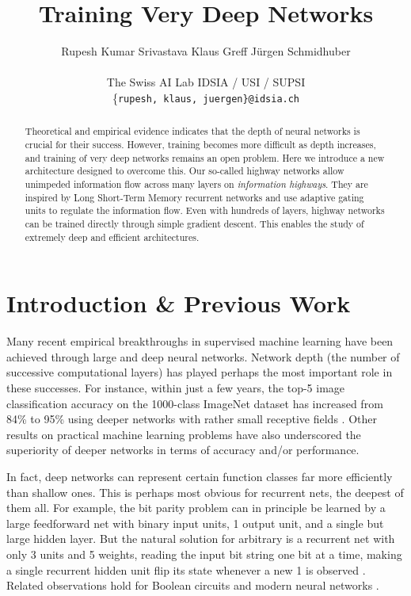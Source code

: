 \documentclass{article}
\title{Training Very Deep Networks}
\author{
Rupesh Kumar Srivastava \quad
Klaus Greff \quad
J{\"u}rgen Schmidhuber\\
\\
The Swiss AI Lab IDSIA /  USI / SUPSI\\
{\{\tt rupesh,\! klaus,\! juergen\}@idsia.ch}\\
}
\begin{document}
\maketitle

\begin{abstract}
Theoretical and empirical evidence indicates that the depth of neural networks is crucial for their success. However, training becomes more difficult as depth increases, and training of very deep networks remains an open problem. Here we introduce a new architecture designed to overcome this. 
Our so-called highway networks allow unimpeded information flow across many layers on \emph{information highways}. 
They are inspired by Long Short-Term Memory recurrent networks and use adaptive gating units to regulate the information flow.
Even with hundreds of layers, highway networks can be trained 
directly through simple gradient descent. This enables the study of extremely deep and efficient architectures.

\end{abstract}

\section{Introduction \& Previous Work}\label{sec:intro}

Many recent empirical breakthroughs in supervised machine learning have been achieved through  large and deep neural networks. Network depth (the number of successive computational layers) has played perhaps the most important role in these successes. For instance, within just a few years, the top-5 image classification accuracy on the 1000-class ImageNet dataset has increased from 84\% \cite{Krizhevsky2012} to 95\% \cite{Szegedy2014,Simonyan2014} using deeper networks with rather small receptive fields \cite{Ciresan2011,Ciresan2012}.
Other results on practical machine learning problems have also underscored the superiority of deeper networks \cite{Yu2013} in terms of accuracy and/or performance.

In fact, deep networks can represent certain function classes far more efficiently than shallow ones. This is perhaps most obvious for recurrent nets, the deepest of them all. For example, the  bit parity problem can in principle be learned by a large feedforward net with  binary input units, 1 output unit,  and a single but large hidden layer. But the natural solution for arbitrary  is a recurrent net with only 3 units and 5 weights, reading the input bit string one bit at a time,  making a single recurrent hidden unit flip its state whenever a new 1 is observed \cite{Hochreiter1996}. 
Related observations hold for Boolean circuits \cite{Hastad1987,Hastad1991} and modern neural networks \cite{Bianchini2014,Montufar2014,Martens2014}.
\end{document}
